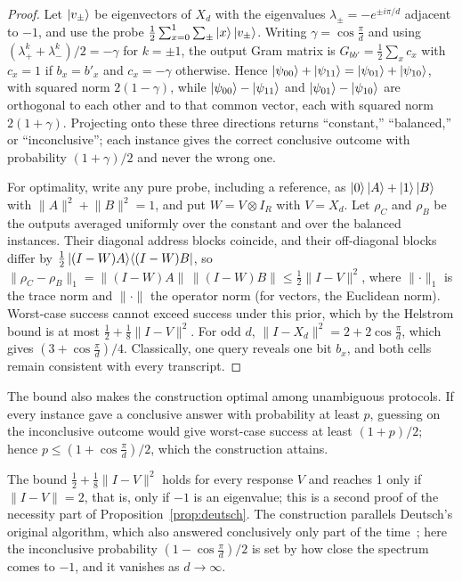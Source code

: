 \documentclass[
  aps,
  pra,
  reprint,
  nofootinbib
]{revtex4-2}
\begin{document}
\begin{proof}
Let \(\ket{v_\pm}\) be eigenvectors of \(X_d\) with the eigenvalues
\(\lambda_\pm=-e^{\pm i\pi/d}\) adjacent to \(-1\), and use the probe
\(\frac12\sum_{x=0}^1\sum_\pm\ket x\ket{v_\pm}\). Writing
\(\gamma=\cos\frac{\pi}{d}\) and using
\((\lambda_+^{k}+\lambda_-^{k})/2=-\gamma\) for \(k=\pm1\), the output Gram
matrix is \(G_{bb'}=\frac12\sum_x c_x\) with \(c_x=1\) if \(b_x=b'_x\) and
\(c_x=-\gamma\) otherwise. Hence
\(\ket{\psi_{00}}+\ket{\psi_{11}}=\ket{\psi_{01}}+\ket{\psi_{10}}\), with squared
norm \(2(1-\gamma)\), while \(\ket{\psi_{00}}-\ket{\psi_{11}}\) and
\(\ket{\psi_{01}}-\ket{\psi_{10}}\) are orthogonal to each other and to that
common vector, each with squared norm \(2(1+\gamma)\). Projecting onto these
three directions returns ``constant,'' ``balanced,'' or ``inconclusive''; each
instance gives the correct conclusive outcome with probability
\((1+\gamma)/2\) and never the wrong one.

For optimality, write any pure probe, including a reference, as
\(\ket0\ket A+\ket1\ket B\) with \(\lVert A\rVert^2+\lVert B\rVert^2=1\), and
put \(W=V\otimes I_R\) with \(V=X_d\). Let \(\rho_C\) and \(\rho_B\) be the
outputs averaged uniformly over the constant and over the balanced instances.
Their diagonal address blocks coincide, and their off-diagonal blocks differ
by \(\frac12\ket{(I-W)A}\!\bra{(I-W)B}\), so
\(\lVert\rho_C-\rho_B\rVert_1=\lVert(I-W)A\rVert\,\lVert(I-W)B\rVert
\le\frac12\lVert I-V\rVert^2\), where \(\lVert\cdot\rVert_1\) is the trace norm
and \(\lVert\cdot\rVert\) the operator norm (for vectors, the Euclidean norm).
Worst-case success cannot exceed success under
this prior, which by the Helstrom bound is at most
\(\frac12+\frac18\lVert I-V\rVert^2\). For odd \(d\),
\(\lVert I-X_d\rVert^2=2+2\cos\frac{\pi}{d}\), which gives
\((3+\cos\frac{\pi}{d})/4\). Classically, one query reveals one bit \(b_x\),
and both cells remain consistent with every transcript.
\end{proof}

The bound also makes the construction optimal among unambiguous protocols. If
every instance gave a conclusive answer with probability at least \(p\),
guessing on the inconclusive outcome would give worst-case success at least
\((1+p)/2\); hence \(p\le(1+\cos\frac{\pi}{d})/2\), which the construction
attains.

The bound \(\frac12+\frac18\lVert I-V\rVert^2\) holds for every response \(V\)
and reaches 1 only if \(\lVert I-V\rVert=2\), that is, only if \(-1\) is an
eigenvalue; this is a second proof of the necessity part of
Proposition~\ref{prop:deutsch}. The construction parallels
Deutsch's original algorithm, which also answered conclusively only part of
the time~\cite{deutsch}; here the inconclusive probability
\((1-\cos\frac{\pi}{d})/2\) is set by how close the spectrum comes to \(-1\),
and it vanishes as \(d\to\infty\).
\end{document}
